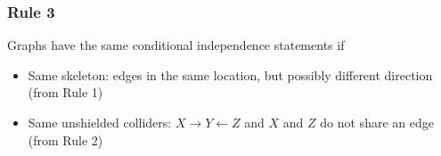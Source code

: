 \documentclass{beamer}
\begin{document}
\begin{frame}
\frametitle{Rule 3}

Graphs have the same conditional independence statements if
\begin{itemize}
    \item Same skeleton: edges in the same location, but possibly different direction (from Rule 1)
    \item Same unshielded colliders: $X \rightarrow Y \leftarrow Z$ and $X$ and $Z$ do not share an edge (from Rule 2)
\end{itemize}
\end{frame}
\end{document}
